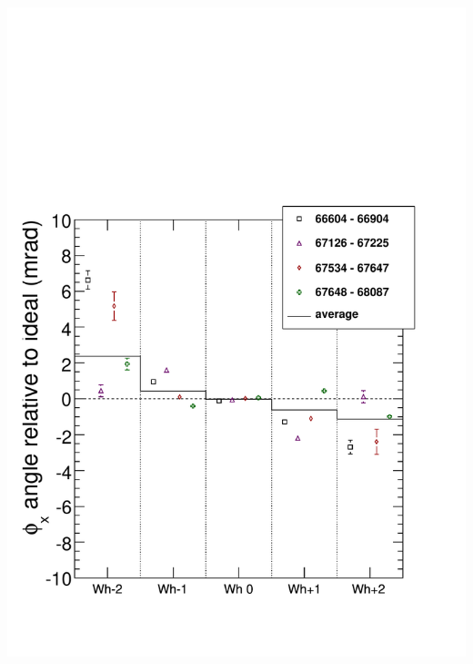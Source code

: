 \documentclass[compress]{beamer}
\begin{document}
\begin{frame}
{\begin{columns}
\includegraphics[width=\linewidth]{bydataset_HIPSC_phix.pdf}

\end{columns}}
\end{frame}
\end{document}
